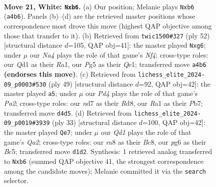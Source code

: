 \documentclass[11pt]{article}
\begin{document}
\clearpage

\begin{figure}[p]\centering
\begin{subfigure}{0.46\textwidth}\centering
\resizebox{\linewidth}{!}{%
\newchessgame
\chessboard[
  setfen={r6r/p2nk2p/1npbp1p1/1q4P1/Np1P3N/P3P2P/1P6/R1BQ1RK1 w - - 1 21},
  showmover=false,
  pgfstyle=straightmove, color=movearrow, markmove={a4-b6}
]}
\caption{}
\end{subfigure}\hfill
\begin{subfigure}{0.46\textwidth}\centering
\resizebox{\linewidth}{!}{%
\newchessgame
\chessboard[
  setfen={r6r/p3qk2/4p1n1/3pPpPb/2pP1N1p/7P/P1PB3K/R3QR2 w - - 2 27},
  showmover=false,
  pgfstyle=straightmove, color=movearrow, markmove={f4-g6}
]}
\caption{}
\end{subfigure}
\\[4pt]
\begin{subfigure}{0.46\textwidth}\centering
\resizebox{\linewidth}{!}{%
\newchessgame
\chessboard[
  setfen={3rr1k1/ppq3p1/1n2pb1p/2n1Np1P/2P5/1P2QPNR/PB4P1/4RK2 b - - 6 25},
  showmover=false,
  pgfstyle=straightmove, color=movearrow, markmove={a7-a5}
]}
\caption{}
\end{subfigure}\hfill
\begin{subfigure}{0.46\textwidth}\centering
\resizebox{\linewidth}{!}{%
\newchessgame
\chessboard[
  setfen={r1b1k3/q4pp1/p1p5/1pb1p1P1/4P1nr/2N2Q2/PPP2P2/2KRBB1R b q - 6 17},
  showmover=false,
  pgfstyle=straightmove, color=movearrow, markmove={a7-e7}
]}
\caption{}
\end{subfigure}
\caption{\textbf{Move 21, White: \texttt{Nxb6}.} (a) Our position; Melanie plays \texttt{Nxb6} (\texttt{a4b6}). Panels (b)--(d) are the retrieved master positions whose correspondence most drove this move (highest QAP objective among those that transfer to it). (b) Retrieved from \texttt{twic1500\#327} (ply 52) [structural distance $d$=105, QAP obj=41]: the master played \texttt{Nxg6}; under $\mu$ our \emph{Na4} plays the role of that game's \emph{Nf4}; cross-type roles: our \emph{Q}d1 as their \emph{R}a1, our \emph{P}g5 as their \emph{Q}e1; transferred move \texttt{a4b6} \textbf{(endorses this move)}. (c) Retrieved from \texttt{lichess\_elite\_2024-09\_p0003\#530} (ply 49) [structural distance $d$=92, QAP obj=42]: the master played \texttt{a5}; under $\mu$ our \emph{Pd4} plays the role of that game's \emph{Pa2}; cross-type roles: our \emph{n}d7 as their \emph{R}d8, our \emph{R}a1 as their \emph{P}b7; transferred move \texttt{d4d5}. (d) Retrieved from \texttt{lichess\_elite\_2024-09\_p0019\#3939} (ply 33) [structural distance $d$=100, QAP obj=42]: the master played \texttt{Qe7}; under $\mu$ our \emph{Qd1} plays the role of that game's \emph{Qa2}; cross-type roles: our \emph{r}a8 as their \emph{B}c8, our \emph{p}g6 as their \emph{B}c5; transferred move \texttt{d1d2}. Synthesis: 1 retrieved analog transferred to \texttt{Nxb6} (summed QAP objective 41, the strongest correspondence among the candidate moves); Melanie committed it via the \texttt{search} selector.}
\label{fig:thought-m40}
\end{figure}
\end{document}
